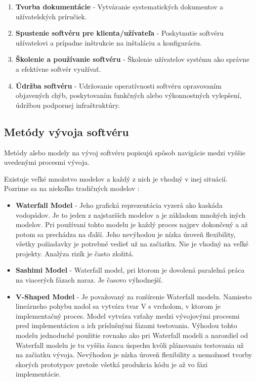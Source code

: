 \documentclass[10pt,twoside,slovak,a4paper]{article}
\begin{document}
\begin{enumerate}
\item \textbf{Tvorba dokumentácie} - Vytváranie systematických dokumentov a užívatelských príručiek.
\item \textbf{Spustenie softvéru pre klienta/užívateľa} - Poskytnutie softvéru užívatelovi a prípadne inštrukcie na inštaláciu a konfiguráciu.
\item \textbf{Školenie a používanie softvéru} - Školenie užívatelov systému ako správne a efektívne softvér využívať.
\item \textbf{Údržba softvéru} - Udržovanie operatívnosti softvéru opravovaním objavených chýb, poskytovaním funkčných alebo výkonnostných vylepšení, údržbou podpornej infraštruktúry.
\end{enumerate}




\subsection{Metódy vývoja softvéru} \label{metody:vyvojSoftveru}
Metódy alebo modely na vývoj softvéru popisujú spôsob navigácie medzi vyššie uvedenými procesmi vývoja.\cite{ModelDef}

Existuje veľké množstvo modelov a každý z nich je vhodný v inej situácií. Pozrime sa na niekoľko tradičných modelov \cite{Methodologies}:
\begin{itemize}
\item \textbf{Waterfall Model} - Jeho grafická reprezentácia vyzerá ako kaskáda vodopádov. Je to jeden z najstarších modelov a je základom mnohých iných modelov. Pri používaní tohto modelu je každý proces najprv dokončený a až potom sa prechádza na ďalší. Jeho nevýhodou je nízka úroveň flexibility, všetky požiadavky je potrebné vedieť už na začiatku. Nie je vhodný na veľké projekty. Analýza rizík je často zložitá.
\item \textbf{Sashimi Model} - Waterfall model, pri ktorom je dovolená paralelná práca na viacerých fázach naraz. Je časovo výhodnejší.
\item \textbf{V-Shaped Model} - Je považovaný za rozšírenie Waterfall modelu. Namiesto lineárneho pohybu nadol sa vytvára tvar V s vrcholom, v ktorom je implementačný proces. Model vytvára vzťahy medzi vývojovými procesmi pred implementáciou a ich príslušnými fázami testovania. Výhodou tohto modelu jednoduché použitie rovnako ako pri Waterfall modeli a narozdiel od Waterfall modelu je tu vyššia šanca úspechu kvôli plánovaniu testovania už na začiatku vývoja. Nevýhodou je nízka úroveň flexibility a nemožnosť tvorby skorých prototypov pretože všetká produkcia kódu je až vo fázi implementácie.
\end{itemize}
\end{document}
